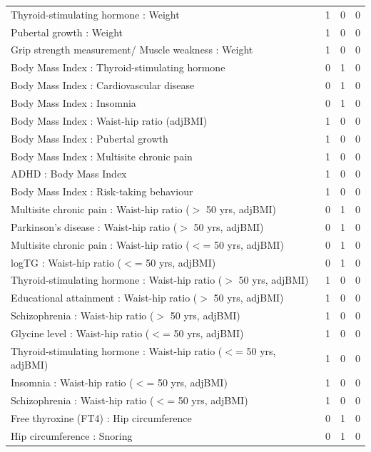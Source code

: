 \begin{table}[ht]
\begin{tabular}{lrrr}
  Thyroid-stimulating hormone  : Weight  &   1 &   0 &   0 \\ 
  Pubertal growth  : Weight  &   1 &   0 &   0 \\ 
  Grip strength measurement/ Muscle weakness : Weight  &   1 &   0 &   0 \\ 
  Body Mass Index  : Thyroid-stimulating hormone  &   0 &   1 &   0 \\ 
  Body Mass Index  : Cardiovascular disease &   0 &   1 &   0 \\ 
  Body Mass Index  : Insomnia &   0 &   1 &   0 \\ 
  Body Mass Index  : Waist-hip ratio (adjBMI) &   1 &   0 &   0 \\ 
  Body Mass Index  : Pubertal growth  &   1 &   0 &   0 \\ 
  Body Mass Index  : Multisite chronic pain &   1 &   0 &   0 \\ 
  ADHD : Body Mass Index  &   1 &   0 &   0 \\ 
  Body Mass Index  : Risk-taking behaviour &   1 &   0 &   0 \\ 
  Multisite chronic pain : Waist-hip ratio ($>$ 50 yrs, adjBMI) &   0 &   1 &   0 \\ 
  Parkinson's disease : Waist-hip ratio ($>$ 50 yrs, adjBMI) &   0 &   1 &   0 \\ 
  Multisite chronic pain : Waist-hip ratio ($<$= 50 yrs, adjBMI) &   0 &   1 &   0 \\ 
  logTG : Waist-hip ratio ($<$= 50 yrs, adjBMI) &   0 &   1 &   0 \\ 
  Thyroid-stimulating hormone  : Waist-hip ratio ($>$ 50 yrs, adjBMI) &   1 &   0 &   0 \\ 
  Educational attainment : Waist-hip ratio ($>$ 50 yrs, adjBMI) &   1 &   0 &   0 \\ 
  Schizophrenia : Waist-hip ratio ($>$ 50 yrs, adjBMI) &   1 &   0 &   0 \\ 
  Glycine level  : Waist-hip ratio ($<$= 50 yrs, adjBMI) &   1 &   0 &   0 \\ 
  Thyroid-stimulating hormone  : Waist-hip ratio ($<$= 50 yrs, adjBMI) &   1 &   0 &   0 \\ 
  Insomnia : Waist-hip ratio ($<$= 50 yrs, adjBMI) &   1 &   0 &   0 \\ 
  Schizophrenia : Waist-hip ratio ($<$= 50 yrs, adjBMI) &   1 &   0 &   0 \\ 
  Free thyroxine (FT4) : Hip circumference  &   0 &   1 &   0 \\ 
  Hip circumference  : Snoring &   0 &   1 &   0 \\ 

\end{tabular}
\end{table}

